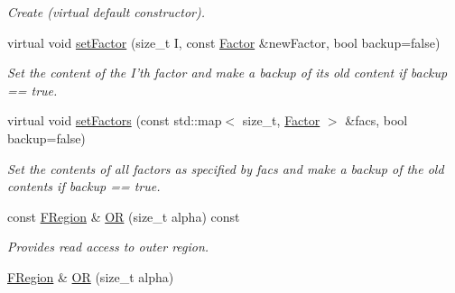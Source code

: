\begin{CompactItemize}
\begin{CompactList}\small\item\em Create (virtual default constructor). \item\end{CompactList}\item 
\hypertarget{classdai_1_1RegionGraph_3ff68e22e5bbd6a37142f6d759956fdf}{
virtual void \hyperlink{classdai_1_1RegionGraph_3ff68e22e5bbd6a37142f6d759956fdf}{setFactor} (size\_\-t I, const \hyperlink{classdai_1_1TFactor}{Factor} \&newFactor, bool backup=false)}
\label{classdai_1_1RegionGraph_3ff68e22e5bbd6a37142f6d759956fdf}

\begin{CompactList}\small\item\em Set the content of the I'th factor and make a backup of its old content if backup == true. \item\end{CompactList}\item 
\hypertarget{classdai_1_1RegionGraph_d856e0dce255c429a4cddaba99c7d0f0}{
virtual void \hyperlink{classdai_1_1RegionGraph_d856e0dce255c429a4cddaba99c7d0f0}{setFactors} (const std::map$<$ size\_\-t, \hyperlink{classdai_1_1TFactor}{Factor} $>$ \&facs, bool backup=false)}
\label{classdai_1_1RegionGraph_d856e0dce255c429a4cddaba99c7d0f0}

\begin{CompactList}\small\item\em Set the contents of all factors as specified by facs and make a backup of the old contents if backup == true. \item\end{CompactList}\item 
\hypertarget{classdai_1_1RegionGraph_d32f10da72fca83bc4fd7c60bf771a40}{
const \hyperlink{classdai_1_1FRegion}{FRegion} \& \hyperlink{classdai_1_1RegionGraph_d32f10da72fca83bc4fd7c60bf771a40}{OR} (size\_\-t alpha) const }
\label{classdai_1_1RegionGraph_d32f10da72fca83bc4fd7c60bf771a40}

\begin{CompactList}\small\item\em Provides read access to outer region. \item\end{CompactList}\item 
\hypertarget{classdai_1_1RegionGraph_70aca393e89fdb7e4dc7535e9bf95676}{
\hyperlink{classdai_1_1FRegion}{FRegion} \& \hyperlink{classdai_1_1RegionGraph_70aca393e89fdb7e4dc7535e9bf95676}{OR} (size\_\-t alpha)}
\label{classdai_1_1RegionGraph_70aca393e89fdb7e4dc7535e9bf95676}


\end{CompactItemize}
